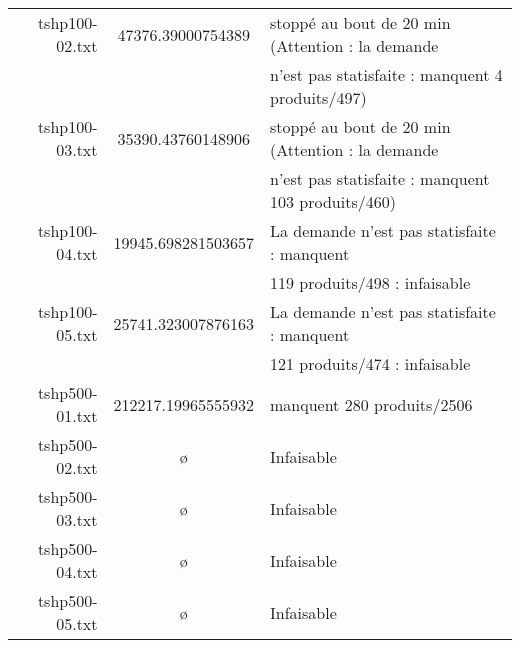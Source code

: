 \documentclass[a4paper,12pt]{article}
\begin{document}
\begin{center}
\begin{tabular}{r | c | l}
tshp100-02.txt & 47376.39000754389 & stopp\'e au bout de 20 min (Attention : la demande \\
& & n'est pas statisfaite : manquent 4 produits/497) \\
tshp100-03.txt & 35390.43760148906 & stopp\'e au bout de 20 min (Attention : la demande \\
& & n'est pas statisfaite : manquent 103 produits/460) \\
tshp100-04.txt & 19945.698281503657 & La demande n'est pas statisfaite : manquent \\
& & 119 produits/498 : infaisable \\
tshp100-05.txt & 25741.323007876163 & La demande n'est pas statisfaite : manquent \\
& & 121 produits/474 : infaisable \\
tshp500-01.txt & 212217.19965555932 & manquent 280 produits/2506 \\
tshp500-02.txt & \o{} & Infaisable \\
tshp500-03.txt & \o{} & Infaisable \\
tshp500-04.txt & \o{} & Infaisable \\
tshp500-05.txt & \o{} & Infaisable \\
  
 \end{tabular}

\end{center}
\end{document}
